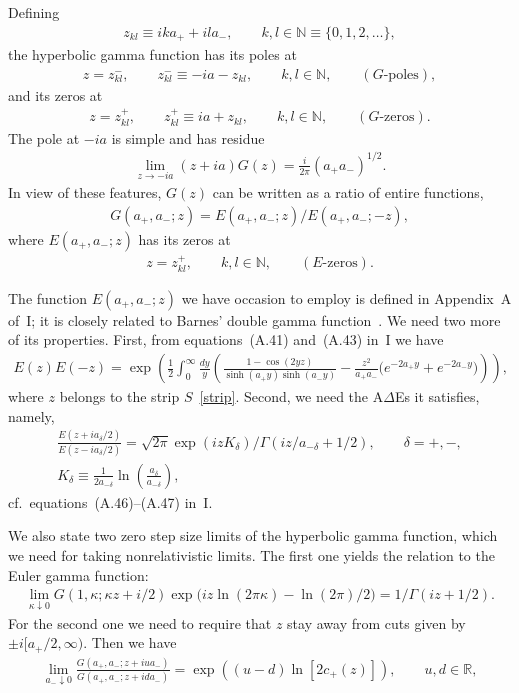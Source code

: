 \documentclass[11pt]{article}
\numberwithin{equation}{section}
\newcommand{\De}{\Delta}
\newcommand{\de}{\delta}
\newcommand{\N}{{\mathbb N}}
\newcommand{\R}{{\mathbb R}}
\newcommand{\aaa}{a_{+},a_{-}}
\begin{document}
Def\/ining
\begin{gather}\label{zkl}
z_{kl}\equiv ika_{+}+ila_{-},\qquad k,l\in\N\equiv \{ 0,1,2,\ldots\},
\end{gather}
the hyperbolic gamma function has its poles at
\begin{gather}\label{Gpo}
z=z_{kl}^-,\qquad z_{kl}^-\equiv -ia -z_{kl},\qquad k,l\in\N,\qquad (G\mbox{-poles}),
\end{gather}
and its zeros at
\begin{gather}\label{Gze}
z=z_{kl}^+,\qquad z_{kl}^+\equiv ia +z_{kl},\qquad k,l\in\N,\qquad (G\mbox{-zeros}).
\end{gather}
The pole at $-ia$ is simple and has residue
\begin{gather}\label{Gres}
\lim_{z\to -ia}(z+ia)G(z)=\frac{i}{2\pi}(a_{+}a_{-})^{1/2}.
\end{gather}
In view of these features, $G(z)$ can be written as a ratio of entire functions,
\begin{gather}\label{GE}
G(\aaa;z)=E(\aaa;z)/E(\aaa;-z),
\end{gather}
where $E(\aaa;z)$ has its zeros at
\begin{gather}\label{Eze}
z=z^{+}_{kl},\qquad k,l\in\N,\qquad (E\mbox{-zeros}).
\end{gather}

The function $E(\aaa;z)$ we have occasion to employ is def\/ined in Appendix~A of~I; it is closely related to Barnes' double gamma function~\cite{barn}. We need two more of its properties. First, from equations~(A.41) and~(A.43) in~I we have
 \begin{gather}\label{EwT}
 E(z)E(-z)=\exp\left(\frac12\int_0^{\infty}\!\frac{dy}{y}\left(
 \frac{1-\cos(2yz)}{\sinh(a_{+}y)\sinh(a_{-}y)}-\frac{z^2}{a_+a_-}\big(e^{-2a_{+}y}+e^{-2a_{-}y}\big)\right)\right),\!\!\!
 \end{gather}
where $z$ belongs to the strip $S$~\eqref{strip}. Second, we need the A$\De$Es it satisf\/ies, namely,
\begin{gather}\label{Eades}
\frac{E(z+ia_{\de}/2)}{E(z-ia_{\de}/2)}=\sqrt{2\pi}\exp(izK_{\de})/\Gamma(iz/a_{-\de}+1/2),\qquad \de=+,-,
\\
K_{\de}\equiv \frac{1}{2a_{-\de}}\ln \left( \frac{a_{\de}}{a_{-\de}}\right),
\end{gather}
cf.~equations~(A.46)--(A.47) in~I.

We also state two zero step size limits of the hyperbolic gamma function, which we need for taking nonrelativistic limits. The f\/irst one yields the relation to the Euler gamma function:
\begin{gather}\label{GhGr}
\lim_{\kappa\downarrow 0}G(1,\kappa;
 \kappa z+i/2)\exp \big(iz\ln(2\pi\kappa)-\ln(2\pi)/2\big) = 1/\Gamma(iz+1/2).
\end{gather}
For the second one we need to require that $z$ stay away from  cuts given by $\pm i[a_+/2,\infty)$. Then we have
\begin{gather}\label{Gnr}
\lim_{a_{-}\downarrow 0}\frac{G(a_+, a_{-};z+iua_{-})}{G(a_+, a_{-};z+ida_{-})}
=\exp((u-d)\ln [2c_+(z)]),\qquad u,d\in\R,
\end{gather}
\setcounter{section}{2}
\setcounter{subsection}{0}
\setcounter{subsubsection}{0}
\setcounter{equation}{24}
\end{document}

